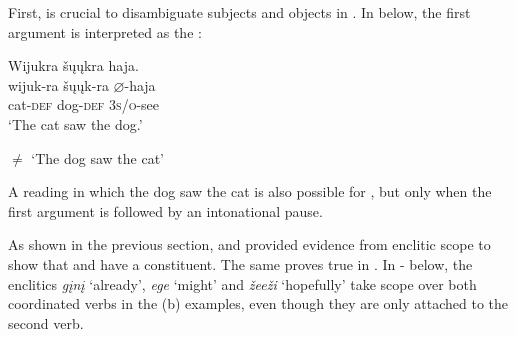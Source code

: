 \documentclass[output=paper]{LSP/langsci}
\begin{document}
First,  is crucial to disambiguate subjects and objects in .  In  below, the first argument is interpreted as the :

\begin{exe}
\ex\label{ex:jrs:31} 
\glll Wijukra	\v{s}\k{u}\k{u}kra 		haja.\\
wijuk-ra 		\v{s}\k{u}\k{u}k-ra 		$\varnothing$-haja \\
cat-\textsc{def} 		dog-\textsc{def} 	\textsc{3s/o}-see \\
\trans `The cat saw the dog.'

$\neq$ `The dog saw the cat'
\end{exe}

A reading in which the dog saw the cat is also possible for , but only when the first argument is followed by an intonational pause.
	
As shown in the previous section, \citet{Boyle2007} and \citet{West2003} provided evidence from enclitic scope to show that  and  have a  constituent.  The same proves true in .  In - below, the enclitics \textit{g\k{i}n\k{i}} `already', \textit{ege} `might' and \textit{\v{z}ee\v{z}i} `hopefully' take scope over both coordinated verbs in the (b) examples, even though they are only attached to the second verb.
\end{document}
